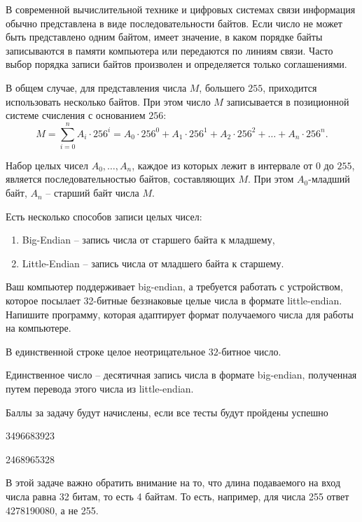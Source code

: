 
В современной вычислительной технике и цифровых системах связи информация обычно представлена в виде последовательности байтов. Если число не может быть представлено одним байтом, имеет значение, в каком порядке байты записываются в памяти компьютера или передаются по линиям связи. Часто выбор порядка записи байтов произволен и определяется только соглашениями.

В общем случае, для представления числа $M$, большего $255$, приходится использовать несколько байтов. При этом число $M$ записывается в позиционной системе счисления с основанием $256$:
$$ M=\sum\limits _{i=0}^{n}A_{i}\cdot 256^{i}=A_{0}\cdot 256^{0}+A_{1}\cdot 256^{1}+A_{2}\cdot 256^{2}+\dots +A_{n}\cdot 256^{n}. $$

Набор целых чисел $ A_{0},\dots ,A_{n} $, каждое из которых лежит в интервале от $ 0 $ до $ 255 $, является последовательностью байтов, составляющих $ M $. При этом $ A_{0} $-младший байт, $  A_{n}  $ -- старший байт числа $ M$.

Есть несколько способов записи целых чисел:

\begin{enumerate}
    \item Big-Endian -- запись числа от старшего байта к младшему,
    \item Little-Endian -- запись числа от младшего байта к старшему.
\end{enumerate}

Ваш компьютер поддерживает big-endian, а требуется работать с устройством, которое посылает 32-битные беззнаковые целые числа в формате little-endian. Напишите программу, которая адаптирует формат получаемого числа для работы на компьютере. 



В единственной строке целое неотрицательное $ 32 $-битное число.

\outputfmtSection

Единственное число -- десятичная запись числа в формате big-endian, полученная путем перевода этого числа из little-endian.

\markSection

Баллы за задачу будут начислены, если все тесты будут пройдены успешно


\begin{myverbbox}[\small]{\vinput}
3496683923
\end{myverbbox}
\begin{myverbbox}[\small]{\voutput}
2468965328
\end{myverbbox}

\solutionSection

В этой задаче важно обратить внимание на то, что длина подаваемого на вход числа равна 32 битам, то есть 4 байтам. То есть, например, для числа 255 ответ 4278190080, а не 255.

